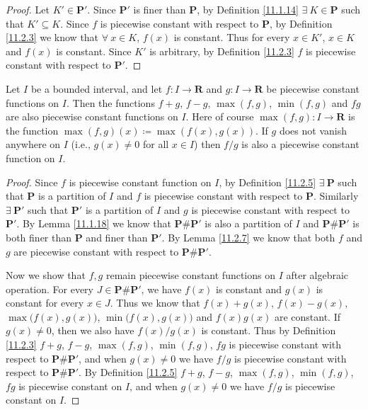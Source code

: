 \begin{proof}
    Let \(K' \in \mathbf{P}'\).
    Since \(\mathbf{P}'\) is finer than \(\mathbf{P}\), by Definition \ref{11.1.14} \(\exists\ K \in \mathbf{P}\) such that \(K' \subseteq K\).
    Since \(f\) is piecewise constant with respect to \(\mathbf{P}\), by Definition \ref{11.2.3} we know that \(\forall\ x \in K\), \(f(x)\) is constant.
    Thus for every \(x \in K'\), \(x \in K\) and \(f(x)\) is constant.
    Since \(K'\) is arbitrary, by Definition \ref{11.2.3} \(f\) is piecewise constant with respect to \(\mathbf{P}'\).
\end{proof}

\begin{lemma}\label{11.2.8}
    Let \(I\) be a bounded interval, and let \(f : I \to \mathbf{R}\) and \(g : I \to \mathbf{R}\) be piecewise constant functions on \(I\).
    Then the functions \(f + g\), \(f - g\), \(\max(f, g)\), \(\min(f, g)\) and \(fg\) are also piecewise constant functions on \(I\).
    Here of course \(\max(f, g) : I \to \mathbf{R}\) is the function \(\max(f, g)(x) \coloneqq \max(f(x), g(x))\).
    If \(g\) does not vanish anywhere on \(I\) (i.e., \(g(x) \neq 0\) for all \(x \in I\)) then \(f / g\) is also a piecewise constant function on \(I\).
\end{lemma}

\begin{proof}
    Since \(f\) is piecewise constant function on \(I\), by Definition \ref{11.2.5} \(\exists\ \mathbf{P}\) such that \(\mathbf{P}\) is a partition of \(I\) and \(f\) is piecewise constant with respect to \(\mathbf{P}\).
    Similarly \(\exists\ \mathbf{P}'\) such that \(\mathbf{P}'\) is a partition of \(I\) and \(g\) is piecewise constant with respect to \(\mathbf{P}'\).
    By Lemma \ref{11.1.18} we know that \(\mathbf{P} \# \mathbf{P}'\) is also a partition of \(I\) and \(\mathbf{P} \# \mathbf{P}'\) is both finer than \(\mathbf{P}\) and finer than \(\mathbf{P}'\).
    By Lemma \ref{11.2.7} we know that both \(f\) and \(g\) are piecewise constant with respect to \(\mathbf{P} \# \mathbf{P}'\).

    Now we show that \(f, g\) remain piecewise constant functions on \(I\) after algebraic operation.
    For every \(J \in \mathbf{P} \# \mathbf{P}'\), we have \(f(x)\) is constant and \(g(x)\) is constant for every \(x \in J\).
    Thus we know that \(f(x) + g(x)\), \(f(x) - g(x)\), \(\max\big(f(x), g(x)\big)\), \(\min\big(f(x), g(x)\big)\) and \(f(x) g(x)\) are constant.
    If \(g(x) \neq 0\), then we also have \(f(x) / g(x)\) is constant.
    Thus by Definition \ref{11.2.3} \(f + g\), \(f - g\), \(\max(f, g)\), \(\min(f, g)\), \(fg\) is piecewise constant with respect to \(\mathbf{P} \# \mathbf{P}'\), and when \(g(x) \neq 0\) we have \(f / g\) is piecewise constant with respect to \(\mathbf{P} \# \mathbf{P}'\).
    By Definition \ref{11.2.5} \(f + g\), \(f - g\), \(\max(f, g)\), \(\min(f, g)\), \(fg\) is piecewise constant on \(I\), and when \(g(x) \neq 0\) we have \(f / g\) is piecewise constant on \(I\).
\end{proof}

